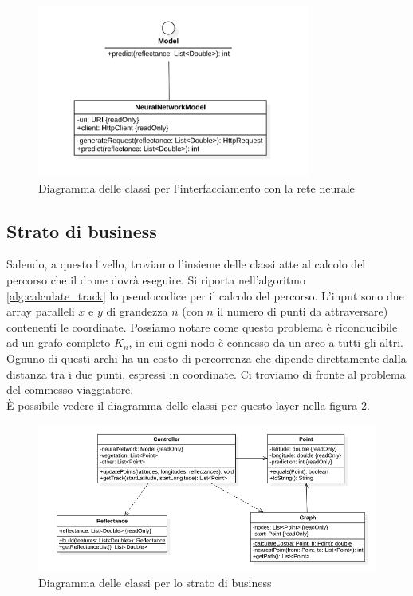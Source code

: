 \begin{figure}
    \centering
    \includegraphics[width=0.8\textwidth]{immagini/model_classes.png}
    \caption{Diagramma delle classi per l'interfacciamento con la rete neurale}
    \label{fig:class_diagram_neural_network}
\end{figure}

\subsection{Strato di business}
Salendo, a questo livello, troviamo l'insieme delle classi atte al calcolo del percorso che il drone dovrà eseguire. Si riporta nell'algoritmo \ref{alg:calculate_track} lo pseudocodice per il calcolo del percorso. L'input sono due array paralleli $x$ e $y$ di grandezza $n$ (con $n$ il numero di punti da attraversare) contenenti le coordinate. Possiamo notare come questo problema è riconducibile ad un grafo completo $K_n$, in cui ogni nodo è connesso da un arco a tutti gli altri. Ognuno di questi archi ha un costo di percorrenza che dipende direttamente dalla distanza tra i due punti, espressi in coordinate. Ci troviamo di fronte al problema del commesso viaggiatore.\\
È possibile vedere il diagramma delle classi per questo layer nella figura \ref{fig:class_diagram_business}.

\begin{figure}
    \centering
    \includegraphics[width=\textwidth]{immagini/business_classes.png}
    \caption{Diagramma delle classi per lo strato di business}
    \label{fig:class_diagram_business}
\end{figure}

